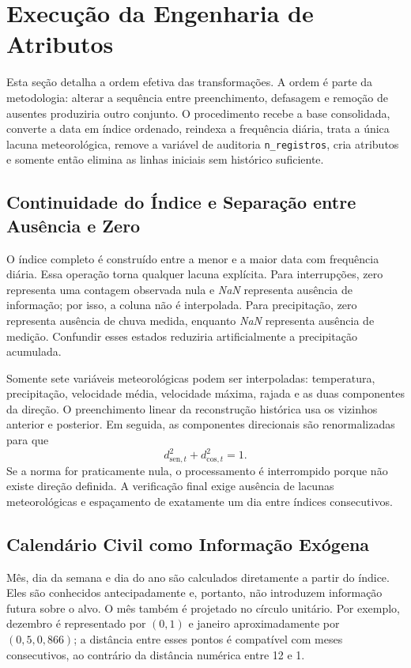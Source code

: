 \section{Execução da Engenharia de Atributos}\label{sec:especificacao_engenharia}

Esta seção detalha a ordem efetiva das transformações. A ordem é parte da metodologia: alterar a sequência entre preenchimento, defasagem e remoção de ausentes produziria outro conjunto. O procedimento recebe a base consolidada, converte a data em índice ordenado, reindexa a frequência diária, trata a única lacuna meteorológica, remove a variável de auditoria \texttt{n\_registros}, cria atributos e somente então elimina as linhas iniciais sem histórico suficiente.

\subsection{Continuidade do Índice e Separação entre Ausência e Zero}

O índice completo é construído entre a menor e a maior data com frequência diária. Essa operação torna qualquer lacuna explícita. Para interrupções, zero representa uma contagem observada nula e \textit{NaN} representa ausência de informação; por isso, a coluna não é interpolada. Para precipitação, zero representa ausência de chuva medida, enquanto \textit{NaN} representa ausência de medição. Confundir esses estados reduziria artificialmente a precipitação acumulada.

Somente sete variáveis meteorológicas podem ser interpoladas: temperatura, precipitação, velocidade média, velocidade máxima, rajada e as duas componentes da direção. O preenchimento linear da reconstrução histórica usa os vizinhos anterior e posterior. Em seguida, as componentes direcionais são renormalizadas para que
\begin{equation}
    d_{\mathrm{sen},t}^{2}+d_{\mathrm{cos},t}^{2}=1.
\end{equation}
Se a norma for praticamente nula, o processamento é interrompido porque não existe direção definida. A verificação final exige ausência de lacunas meteorológicas e espaçamento de exatamente um dia entre índices consecutivos.

\subsection{Calendário Civil como Informação Exógena}

Mês, dia da semana e dia do ano são calculados diretamente a partir do índice. Eles são conhecidos antecipadamente e, portanto, não introduzem informação futura sobre o alvo. O mês também é projetado no círculo unitário. Por exemplo, dezembro é representado por $(0,1)$ e janeiro aproximadamente por $(0{,}5,0{,}866)$; a distância entre esses pontos é compatível com meses consecutivos, ao contrário da distância numérica entre 12 e 1.

